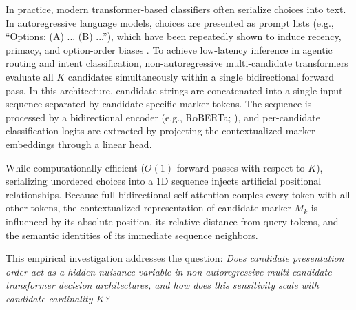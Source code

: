 \documentclass[10pt]{article}
\begin{document}
In practice, modern transformer-based classifiers often serialize choices into text. In autoregressive language models, choices are presented as prompt lists (e.g., ``Options: (A) ... (B) ...''), which have been repeatedly shown to induce recency, primacy, and option-order biases \citep{liu2024lost, pezeshkpour2024large, zheng2024large}. To achieve low-latency inference in agentic routing and intent classification, non-autoregressive multi-candidate transformers \citep{laya2024} evaluate all $K$ candidates simultaneously within a single bidirectional forward pass. In this architecture, candidate strings are concatenated into a single input sequence separated by candidate-specific marker tokens. The sequence is processed by a bidirectional encoder (e.g., RoBERTa; \citealp{liu2019roberta}), and per-candidate classification logits are extracted by projecting the contextualized marker embeddings through a linear head.

While computationally efficient ($O(1)$ forward passes with respect to $K$), serializing unordered choices into a 1D sequence injects artificial positional relationships. Because full bidirectional self-attention couples every token with all other tokens, the contextualized representation of candidate marker $M_k$ is influenced by its absolute position, its relative distance from query tokens, and the semantic identities of its immediate sequence neighbors.

This empirical investigation addresses the question: \textit{Does candidate presentation order act as a hidden nuisance variable in non-autoregressive multi-candidate transformer decision architectures, and how does this sensitivity scale with candidate cardinality $K$?}
\end{document}
